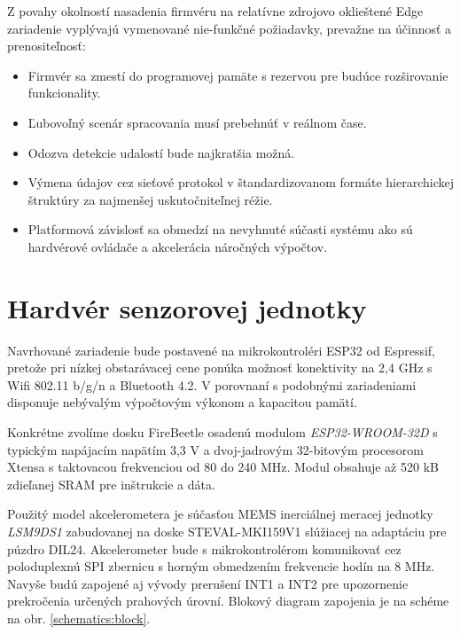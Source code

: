 Z povahy okolností nasadenia firmvéru na relatívne zdrojovo oklieštené Edge zariadenie vyplývajú 
vymenované nie-funkčné požiadavky, prevažne na účinnosť a prenositeľnosť:
\begin{itemize}[noitemsep,topsep=0pt]
\item Firmvér sa zmestí do programovej pamäte s rezervou pre budúce rozširovanie funkcionality.
\item Ľubovoľný scenár spracovania musí prebehnúť v reálnom čase.
\item Odozva detekcie udalostí bude najkratšia možná.
\item Výmena údajov cez sieťové protokol v štandardizovanom formáte hierarchickej štruktúry za najmenšej uskutočniteľnej réžie.
\item Platformová závislosť sa obmedzí na nevyhnuté súčasti systému ako sú hardvérové ovládače a akcelerácia náročných výpočtov.
\end{itemize}

\section{Hardvér senzorovej jednotky}
Navrhované zariadenie bude postavené na mikrokontroléri ESP32 od Espressif, pretože pri nízkej obstarávacej cene
ponúka možnosť konektivity na 2,4 GHz s Wifi 802.11 b/g/n a Bluetooth 4.2. V porovnaní s podobnými zariadeniami disponuje 
nebývalým výpočtovým výkonom a kapacitou pamätí.

Konkrétne zvolíme dosku FireBeetle osadenú modulom \emph{ESP32-WROOM-32D} s typickým napájacím napätím 3,3 V a dvoj-jadrovým 
32-bitovým procesorom Xtensa s taktovacou frekvenciou od 80 do 240 MHz. Modul obsahuje až 520 kB zdieľanej SRAM 
pre inštrukcie a dáta. 

Použitý model akcelerometera je súčasťou MEMS inerciálnej meracej jednotky \emph{LSM9DS1} zabudovanej na doske
STEVAL-MKI159V1 slúžiacej na adaptáciu pre púzdro DIL24. Akcelerometer bude s mikrokontrolérom komunikovať cez
poloduplexnú SPI zbernicu s horným obmedzením frekvencie hodín na 8 MHz. Navyše budú zapojené aj vývody prerušení INT1 a INT2
pre upozornenie prekročenia určených prahových úrovní. Blokový diagram zapojenia je na schéme na obr. \ref{schematics:block}.

